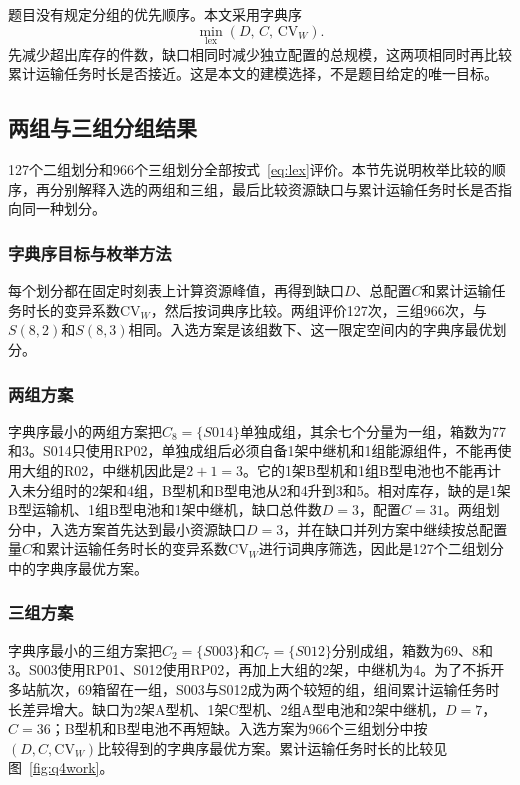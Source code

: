 题目没有规定分组的优先顺序。本文采用字典序
\begin{equation}
\min_{\mathrm{lex}}(D,\,C,\,\mathrm{CV}_W).
\label{eq:lex}
\end{equation}
先减少超出库存的件数，缺口相同时减少独立配置的总规模，这两项相同时再比较累计运输任务时长是否接近。这是本文的建模选择，不是题目给定的唯一目标。

\subsection{两组与三组分组结果}
\label{sec:q4result}

127个二组划分和966个三组划分全部按式~\eqref{eq:lex}评价。本节先说明枚举比较的顺序，再分别解释入选的两组和三组，最后比较资源缺口与累计运输任务时长是否指向同一种划分。

\subsubsection{字典序目标与枚举方法}

每个划分都在固定时刻表上计算资源峰值，再得到缺口$D$、总配置$C$和累计运输任务时长的变异系数$\mathrm{CV}_W$，然后按词典序比较。两组评价127次，三组966次，与$S(8,2)$和$S(8,3)$相同。入选方案是该组数下、这一限定空间内的字典序最优划分。

\subsubsection{两组方案}

字典序最小的两组方案把$C_8=\{S014\}$单独成组，其余七个分量为一组，箱数为77和3。S014只使用RP02，单独成组后必须自备1架中继机和1组能源组件，不能再使用大组的R02，中继机因此是$2+1=3$。它的1架B型机和1组B型电池也不能再计入未分组时的2架和4组，B型机和B型电池从2和4升到3和5。相对库存，缺的是1架B型运输机、1组B型电池和1架中继机，缺口总件数$D=3$，配置$C=31$。两组划分中，入选方案首先达到最小资源缺口$D=3$，并在缺口并列方案中继续按总配置量$C$和累计运输任务时长的变异系数$\mathrm{CV}_W$进行词典序筛选，因此是127个二组划分中的字典序最优方案。

\subsubsection{三组方案}

字典序最小的三组方案把$C_2=\{S003\}$和$C_7=\{S012\}$分别成组，箱数为69、8和3。S003使用RP01、S012使用RP02，再加上大组的2架，中继机为4。为了不拆开多站航次，69箱留在一组，S003与S012成为两个较短的组，组间累计运输任务时长差异增大。缺口为2架A型机、1架C型机、2组A型电池和2架中继机，$D=7$，$C=36$；B型机和B型电池不再短缺。入选方案为966个三组划分中按$(D,C,\mathrm{CV}_W)$比较得到的字典序最优方案。累计运输任务时长的比较见图~\ref{fig:q4work}。


